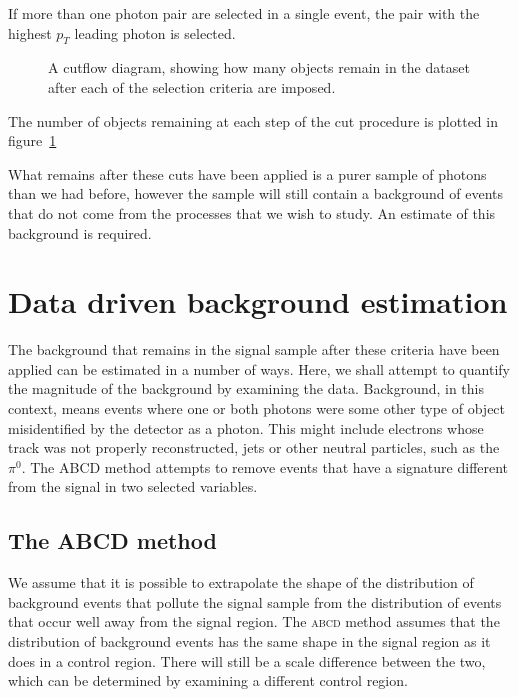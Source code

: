 If more than one photon pair are selected in a single event, the pair with the highest $p_T$ leading photon is selected.

\begin{figure}[htp]
\begin{minipage}[t]{.69\textwidth}
\begin{infilsf} \tiny
\phantom{p}

\end{infilsf}
\end{minipage}\hfill\begin{minipage}[t]{.3\textwidth}
\caption{A cutflow diagram, showing how many objects remain in the dataset after each of the selection criteria are imposed.
\label{cutflow}}
\end{minipage}
\end{figure}

The number of objects remaining at each step of the cut procedure is plotted in figure~\ref{cutflow}

What remains after these cuts have been applied is a purer sample of photons than we had before, however the sample will still contain a background of events that do not come from the processes that we wish to study. An estimate of this background is required.

\section{Data driven background estimation}
The background that remains in the signal sample after these criteria have been applied can be estimated in a number of ways. Here, we shall attempt to quantify the magnitude of the background by examining the data. Background, in this context, means events where one or both photons were some other type of object misidentified by the detector as a photon. This might include electrons whose track was not properly reconstructed, jets or other neutral particles, such as the $\pi^0$. The ABCD method attempts to remove events that have a signature different from the signal in two selected variables.

\subsection{The ABCD method}
We assume that it is possible to extrapolate the shape of the distribution of background events that pollute the signal sample from the distribution of events that occur well away from the signal region. The \textsc{abcd} method assumes that the distribution of background events has the same shape in the signal region as it does in a control region. There will still be a scale difference between the two, which can be determined by examining a different control region.

